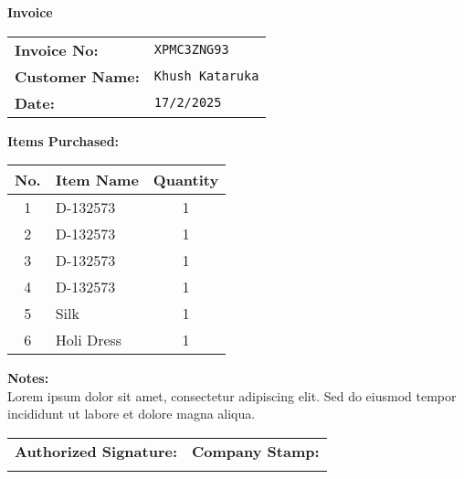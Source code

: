 \documentclass{article}
\begin{document}
        \begin{center}
            {\Huge \textbf{Invoice}} \\[1em]
        \end{center}

        \noindent
        \begin{tabular}{@{}ll@{}}
            \textbf{Invoice No:} & \texttt{XPMC3ZNG93} \\
            \textbf{Customer Name:} & \texttt{Khush Kataruka} \\
            \textbf{Date:} & \texttt{17/2/2025} \\
        \end{tabular}

        \vspace{2em}

        \textbf{Items Purchased:} \\

        \begin{tabular}{|c|l|c|}
            \hline
            \textbf{No.} & \textbf{Item Name} & \textbf{Quantity} \\
            \hline
            1 & D-132573 & 1 \\ \hline
2 & D-132573 & 1 \\ \hline
3 & D-132573 & 1 \\ \hline
4 & D-132573 & 1 \\ \hline
5 & Silk & 1 \\ \hline
6 & Holi Dress & 1 \\ \hline
        \end{tabular}

        \vspace{2em}

        \noindent
        \textbf{Notes:} \\
        Lorem ipsum dolor sit amet, consectetur adipiscing elit. Sed do eiusmod tempor incididunt ut labore et dolore magna aliqua.
        \vspace{1em}

        \noindent
        \begin{tabular}{@{}p{}p{}@{}}
            \textbf{Authorized Signature:} & \textbf{Company Stamp:} \\
            \vspace{2cm} & \vspace{2cm} \\
        \end{tabular}

        
\end{document}
